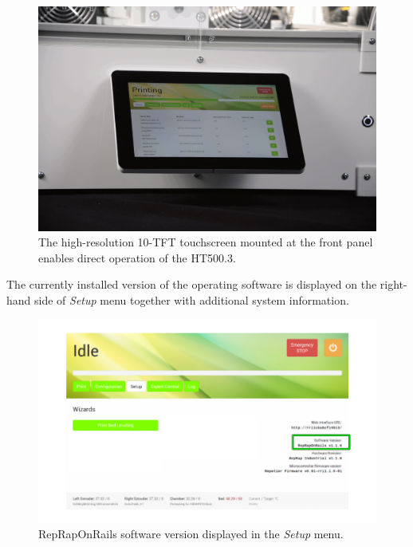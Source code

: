 \begin{figure}[H]
  \centering
  \includegraphics[width=.7\linewidth]{./img/touchscreen.png}
  \caption{The high-resolution 10\textquotedbl-TFT touchscreen mounted at the front panel enables direct operation of the HT500.3.}
\end{figure}

The currently installed version
of the operating software is displayed on the right-hand side of \emph{Setup} menu together with additional system information.

\begin{figure}[H]
  \centering
  \includegraphics[width=.7\linewidth]{./img/gui_setupmenu_rrorversion.png}
  \caption{RepRapOnRails software version displayed in the \emph{Setup} menu.}
\end{figure}

